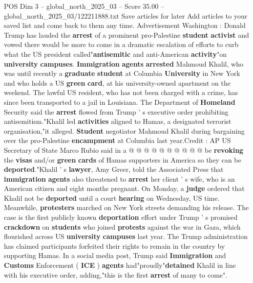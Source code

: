 \begin{textsample}{POS Dim 3 – global\_north\_2025\_03 – Score 35.00 – global\_north\_2025\_03/122211888.txt}  \label{ex:f3_pos_023}
Save articles for later Add articles to your saved list and come back to them any time.
Advertisement Washington : Donald Trump has lauded the \textbf{arrest} of a prominent pro-Palestine \textbf{student} \textbf{activist} and vowed there would be more to come in a dramatic escalation of efforts to curb what the US president called"\textbf{antisemitic} and anti-American \textbf{activity}"on \textbf{university} \textbf{campuses}. \textbf{Immigration} \textbf{agents} \textbf{arrested} Mahmoud Khalil, who was until recently a \textbf{graduate} \textbf{student} at Columbia \textbf{University} in New York and who holds a US \textbf{green} \textbf{card}, at his university-owned apartment on the weekend.
The lawful US resident, who has not been charged with a crime, has since been transported to a jail in Louisiana.
The Department of \textbf{Homeland} Security said the \textbf{arrest} flowed from Trump ' s executive order prohibiting antisemitism."Khalil led \textbf{activities} aligned to Hamas, a designated terrorist organisation,"it alleged. \textbf{Student} negotiator Mahmoud Khalil during bargaining over the pro-Palestine \textbf{encampment} at Columbia last year.Credit : AP US Secretary of State Marco Rubio said in a @ @ @ @ @ @ @ @ @ @ be \textbf{revoking} the \textbf{visas} and/or \textbf{green} \textbf{cards} of Hamas supporters in America so they can be \textbf{deported}."Khalil ' s \textbf{lawyer}, Amy Greer, told the Associated Press that \textbf{immigration} \textbf{agents} also threatened to \textbf{arrest} her client ' s wife, who is an American citizen and eight months pregnant.
On Monday, a \textbf{judge} ordered that Khalil not be \textbf{deported} until a court \textbf{hearing} on Wednesday, US time.
Meanwhile, \textbf{protesters} marched on New York streets demanding his release.
The case is the first publicly known \textbf{deportation} effort under Trump ' s promised \textbf{crackdown} on \textbf{students} who joined \textbf{protests} against the war in Gaza, which flourished across US \textbf{university} \textbf{campuses} last year.
The Trump administration has claimed participants forfeited their rights to remain in the country by supporting Hamas.
In a social media post, Trump said \textbf{Immigration} and \textbf{Customs} Enforcement ( \textbf{ICE} ) \textbf{agents} had"proudly"\textbf{detained} Khalil in line with his executive order, adding,"this is the first \textbf{arrest} of many to come".

\end{textsample}
